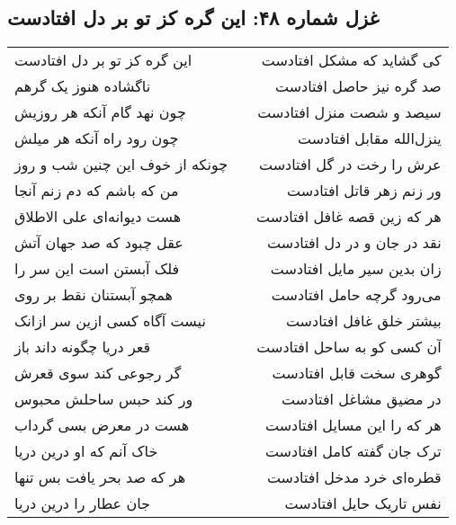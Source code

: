 \begin{center}
\section*{غزل شماره ۴۸: این گره کز تو بر دل افتادست}
\label{sec:048}
\begin{longtable}{l p{0.5cm} r}
این گره کز تو بر دل افتادست
&&
کی گشاید که مشکل افتادست
\\
ناگشاده هنوز یک گرهم
&&
صد گره نیز حاصل افتادست
\\
چون نهد گام آنکه هر روزیش
&&
سیصد و شصت منزل افتادست
\\
چون رود راه آنکه هر میلش
&&
ینزل‌الله مقابل افتادست
\\
چونکه از خوف این چنین شب و روز
&&
عرش را رخت در گل افتادست
\\
من که باشم که دم زنم آنجا
&&
ور زنم زهر قاتل افتادست
\\
هست دیوانه‌ای علی الاطلاق
&&
هر که زین قصه غافل افتادست
\\
عقل چبود که صد جهان آتش
&&
نقد در جان و در دل افتادست
\\
فلک آبستن است این سر را
&&
زان بدین سیر مایل افتادست
\\
همچو آبستنان نقط بر روی
&&
می‌رود گرچه حامل افتادست
\\
نیست آگاه کسی ازین سر ازانک
&&
بیشتر خلق غافل افتادست
\\
قعر دریا چگونه داند باز
&&
آن کسی کو به ساحل افتادست
\\
گر رجوعی کند سوی قعرش
&&
گوهری سخت قابل افتادست
\\
ور کند حبس ساحلش محبوس
&&
در مضیق مشاغل افتادست
\\
هست در معرض بسی گرداب
&&
هر که را این مسایل افتادست
\\
خاک آنم که او درین دریا
&&
ترک جان گفته کامل افتادست
\\
هر که صد بحر یافت بس تنها
&&
قطره‌ای خرد مدخل افتادست
\\
جان عطار را درین دریا
&&
نفس تاریک حایل افتادست
\\
\end{longtable}
\end{center}
